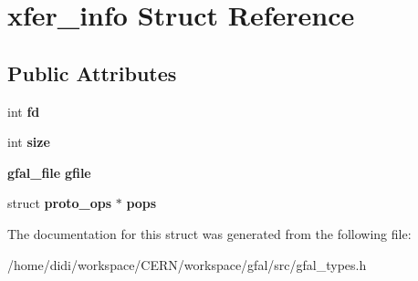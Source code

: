 \section{xfer\_\-info Struct Reference}
\label{structxfer__info}
\subsection*{Public Attributes}
\begin{DoxyCompactItemize}
\item 
int {\bfseries fd}\label{structxfer__info_abf0ffb1a4b8c4f610d5378ade1eaa96a}

\item 
int {\bfseries size}\label{structxfer__info_a2d9510e2c5baab06c4c7731fa0e3082f}

\item 
{\bf gfal\_\-file} {\bfseries gfile}\label{structxfer__info_aa25adf74da3e4f5ff1d2e465cac4af17}

\item 
struct {\bf proto\_\-ops} $\ast$ {\bfseries pops}\label{structxfer__info_a0397120876da7fb7c55d11d550076c41}

\end{DoxyCompactItemize}


The documentation for this struct was generated from the following file:\begin{DoxyCompactItemize}
\item 
/home/didi/workspace/CERN/workspace/gfal/src/gfal\_\-types.h\end{DoxyCompactItemize}
